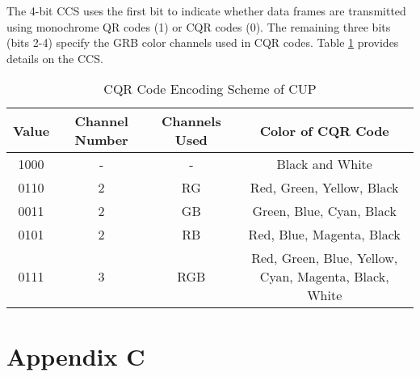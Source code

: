 \documentclass[preprint,12pt]{elsarticle}
\begin{document}
The 4-bit CCS uses the first bit to indicate whether data frames are transmitted using monochrome QR codes (1) or CQR codes (0). The remaining three bits (bits 2-4) specify the GRB color channels used in CQR codes. Table \ref{tab:ccs} provides details on the CCS.

\begin{table}[H]
\centering
\caption{CQR Code Encoding Scheme of CUP}
\begin{tabular}{ c c c c }
\hline
Value& Channel Number & Channels Used & Color of CQR Code \\ \hline
1000  & - & - & Black and White  \\ 
0110  & 2 & RG & Red, Green, Yellow, Black  \\ 
0011  & 2  & GB & Green, Blue, Cyan, Black  \\ 
0101  & 2  & RB & Red, Blue, Magenta, Black  \\
\multirow{3}{*}{0111} & \multirow{3}{*}{3} & \multirow{3}{*}{RGB} & \parbox[t]{4.3cm}{\centering Red, Green, Blue, Yellow, Cyan, Magenta, Black, White} \\ 
\hline
\end{tabular}
\label{tab:ccs}
\end{table}

\section*{Appendix C}

\end{document}
